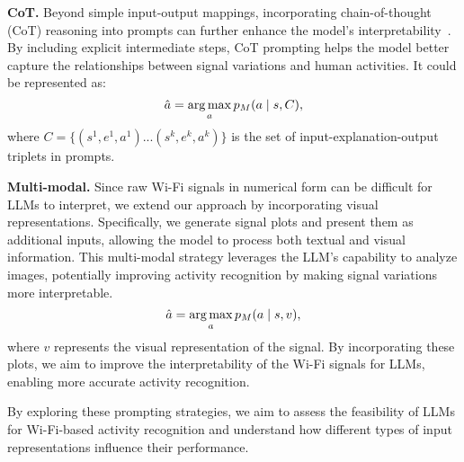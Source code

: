 \textbf{CoT.} Beyond simple input-output mappings, incorporating chain-of-thought (CoT) reasoning into prompts can further enhance the model's interpretability~\cite{nye2021show, wei2022chain}. By including explicit intermediate steps, CoT prompting helps the model better capture the relationships between signal variations and human activities. It could be represented as:
\vspace{-3mm}
\begin{equation}
   \hat{a}=\operatorname*{arg\,max}_a p_{M}(a\mid s,C),
\end{equation}
where $C=\{(s^1,e^1,a^1)...(s^k,e^k,a^k)\}$ is the set of input-explanation-output triplets in prompts. 

\textbf{Multi-modal.}
Since raw Wi-Fi signals in numerical form can be difficult for LLMs to interpret, we extend our approach by incorporating visual representations. Specifically, we generate signal plots and present them as additional inputs, allowing the model to process both textual and visual information. This multi-modal strategy leverages the LLM's capability to analyze images, potentially improving activity recognition by making signal variations more interpretable.
\vspace{-3mm}
\begin{equation}
   \hat{a}=\operatorname*{arg\,max}_a p_{M}(a\mid s,v),
\end{equation}
where $v$ represents the visual representation of the signal. By incorporating these plots, we aim to improve the interpretability of the Wi-Fi signals for LLMs, enabling more accurate activity recognition.

By exploring these prompting strategies, we aim to assess the feasibility of LLMs for Wi-Fi-based activity recognition and understand how different types of input representations influence their performance. 